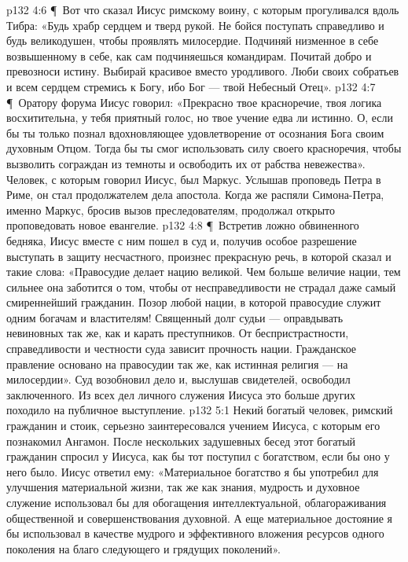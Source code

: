 \vs p132 4:6 \P\ Вот что сказал Иисус римскому воину, с которым прогуливался вдоль Тибра: «Будь храбр сердцем и тверд рукой. Не бойся поступать справедливо и будь великодушен, чтобы проявлять милосердие. Подчиняй низменное в себе возвышенному в себе, как сам подчиняешься командирам. Почитай добро и превозноси истину. Выбирай красивое вместо уродливого. Люби своих собратьев и всем сердцем стремись к Богу, ибо Бог --- твой Небесный Отец».
\vs p132 4:7 \P\ Оратору форума Иисус говорил: «Прекрасно твое красноречие, твоя логика восхитительна, у тебя приятный голос, но твое учение едва ли истинно. О, если бы ты только познал вдохновляющее удовлетворение от осознания Бога своим духовным Отцом. Тогда бы ты смог использовать силу своего красноречия, чтобы вызволить сограждан из темноты и освободить их от рабства невежества». Человек, с которым говорил Иисус, был Маркус. Услышав проповедь Петра в Риме, он стал продолжателем дела апостола. Когда же распяли Симона\hyp{}Петра, именно Маркус, бросив вызов преследователям, продолжал открыто проповедовать новое евангелие.
\vs p132 4:8 \P\ Встретив ложно обвиненного бедняка, Иисус вместе с ним пошел в суд и, получив особое разрешение выступать в защиту несчастного, произнес прекрасную речь, в которой сказал и такие слова: «Правосудие делает нацию великой. Чем больше величие нации, тем сильнее она заботится о том, чтобы от несправедливости не страдал даже самый смиреннейший гражданин. Позор любой нации, в которой правосудие служит одним богачам и властителям! Священный долг судьи --- оправдывать невиновных так же, как и карать преступников. От беспристрастности, справедливости и честности суда зависит прочность нации. Гражданское правление основано на правосудии так же, как истинная религия --- на милосердии». Суд возобновил дело и, выслушав свидетелей, освободил заключенного. Из всех дел личного служения Иисуса это больше других походило на публичное выступление.
\vs p132 5:1 Некий богатый человек, римский гражданин и стоик, серьезно заинтересовался учением Иисуса, с которым его познакомил Ангамон. После нескольких задушевных бесед этот богатый гражданин спросил у Иисуса, как бы тот поступил с богатством, если бы оно у него было. Иисус ответил ему: «Материальное богатство я бы употребил для улучшения материальной жизни, так же как знания, мудрость и духовное служение использовал бы для обогащения интеллектуальной, облагораживания общественной и совершенствования духовной. А еще материальное достояние я бы использовал в качестве мудрого и эффективного вложения ресурсов одного поколения на благо следующего и грядущих поколений».
